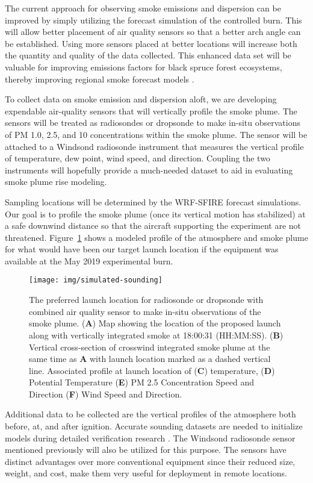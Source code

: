 \documentclass[preprints,article,accept,moreauthors,pdftex]{Definitions/mdpi}
\begin{document}
The current approach for observing smoke emissions and dispersion can be improved by simply utilizing the forecast simulation of the controlled burn. This will allow better placement of air quality sensors so that a better arch angle can be established. Using more sensors placed at better locations will increase both the quantity and quality of the data collected. This enhanced data set will be valuable for improving emissions factors for black spruce forest ecosystems, thereby improving regional smoke forecast models \cite{prichard_wildland_2020}.

To collect data on smoke emission and dispersion aloft, we are developing expendable air-quality sensors that will vertically profile the smoke plume. The sensors will be treated as radiosondes or dropsonde to make in-situ observations of PM 1.0, 2.5, and 10 concentrations within the smoke plume. The sensor will be attached to a Windsond radiosonde instrument \cite{bessardon_evaluation_2019} that measures the vertical profile of temperature, dew point, wind speed, and direction. Coupling the two instruments will hopefully provide a much-needed dataset to aid in evaluating smoke plume rise modeling.

Sampling locations will be determined by the WRF-SFIRE forecast simulations. Our goal is to profile the smoke plume (once its vertical motion has stabilized) at a safe downwind distance so that the aircraft supporting the experiment are not threatened. Figure~\ref{fig8} shows a modeled profile of the atmosphere and smoke plume for what would have been our target launch location if the equipment was available at the May 2019 experimental burn.

\begin{figure}[H]
\centering
 \texttt{[image: img/simulated-sounding]}
 \caption{The preferred launch location for radiosonde or dropsonde with combined air quality sensor to make in-situ observations of the smoke plume. (\textbf{A}) Map showing the location of the proposed launch along with vertically integrated smoke at 18:00:31 (HH:MM:SS). (\textbf{B}) Vertical cross-section of crosswind integrated smoke plume at the same time as \textbf{A} with launch location marked as a dashed vertical line. Associated profile at launch location of (\textbf{C}) temperature, (\textbf{D}) Potential Temperature (\textbf{E}) PM 2.5 Concentration Speed and Direction (\textbf{F}) Wind Speed and Direction. \label{fig8}}
 \end{figure}

Additional data to be collected are the vertical profiles of the atmosphere both before, at, and after ignition. Accurate sounding datasets are needed to initialize models during detailed verification research \cite{kochanski_experimental_2018,moisseeva_capturing_2019}. The Windsond radiosonde sensor mentioned previously will also be utilized for this purpose. The sensors have distinct advantages over more conventional equipment since their reduced size, weight, and cost, make them very useful for deployment in remote locations.
\end{document}
